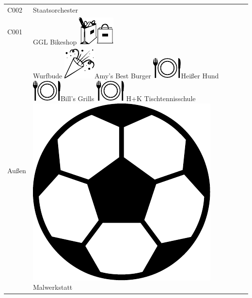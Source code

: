 \documentclass[12pt]{article}
\newcommand{\ball}{\includegraphics[height=.7\baselineskip]{ball.pdf}}
\newcommand{\essen}{\includegraphics[height=.7\baselineskip]{essen.pdf}}
\newcommand{\shopping}{\includegraphics[height=.7\baselineskip]{shopping.pdf}}
\newcommand{\party}{\includegraphics[height=.7\baselineskip]{party.pdf}}
\begin{document}
\begin{minipage}{.28\textwidth}
\begin{framed}
\begin{tabular}{p{1cm}p{5cm}}
            C002 & Staatsorchester \\
            C001 & GGL Bikeshop \shopping \\
            Außen & Wurfbude \party \newline Amy's Best Burger \essen \newline Heißer Hund \essen \newline Bill's Grills \essen
            \newline H+K Tischtennisschule \ball \newline Malwerkstatt\\
        \end{tabular}
    \end{framed}
\end{minipage}
\end{document}
